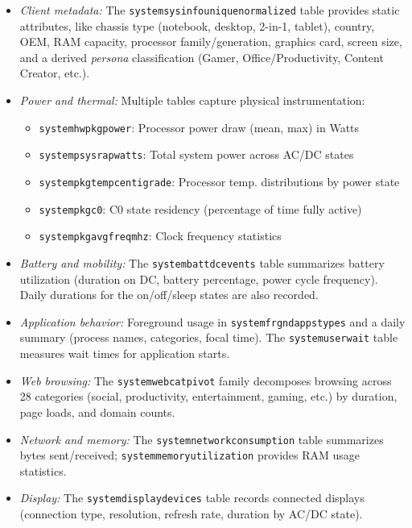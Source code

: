 \documentclass[12pt,letterpaper]{article}
\renewcommand{\_}{\textunderscore\allowbreak}
\begin{document}
\begin{itemize}
    \item \textit{Client metadata:} The \texttt{system\_sysinfo\_unique\_normalized} table provides static attributes, like chassis type (notebook, desktop, 2-in-1, tablet), country, OEM, RAM capacity, processor family/generation, graphics card, screen size, and a derived \textit{persona} classification (Gamer, Office/Productivity, Content Creator, etc.).
    
    \item \textit{Power and thermal:} Multiple tables capture physical instrumentation:
    \begin{itemize}
        \item \texttt{system\_hw\_pkg\_power}: Processor power draw (mean, max) in Watts
        \item \texttt{system\_psys\_rap\_watts}: Total system power across AC/DC states
        \item \texttt{system\_pkg\_temp\_centigrade}: Processor temp. distributions by power state
        \item \texttt{system\_pkg\_c0}: C0 state residency (percentage of time fully active)
        \item \texttt{system\_pkg\_avg\_freq\_mhz}: Clock frequency statistics
    \end{itemize}
    
    \item \textit{Battery and mobility:} The \texttt{system\_batt\_dc\_events} table summarizes battery utilization (duration on DC, battery percentage, power cycle frequency). Daily durations for the on/off/sleep states are also recorded.
    
    \item \textit{Application behavior:} Foreground usage in \texttt{system\_frgnd\_apps\_types} and a daily summary (process names, categories, focal time). The \texttt{system\_userwait} table measures wait times for application starts.
    
    \item \textit{Web browsing:} The \texttt{system\_web\_cat\_pivot\_*} family decomposes browsing across 28 categories (social, productivity, entertainment, gaming, etc.) by duration, page loads, and domain counts.
    
    \item \textit{Network and memory:} The \texttt{system\_network\_consumption} table summarizes bytes sent/received; \texttt{system\_memory\_utilization} provides RAM usage statistics.
    
    \item \textit{Display:} The \texttt{system\_display\_devices} table records connected displays (connection type, resolution, refresh rate, duration by AC/DC state).
\end{itemize}
\end{document}
